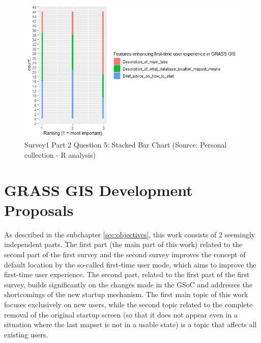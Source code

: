 \documentclass[a4paper,10pt,twoside]{article}
\begin{document}
\vspace{0.3cm}
\begin{figure}[hbt!] 
\begin{center}
\includegraphics[width=15cm]{../surveys/analyzed_data/survey1_part2_question5_histogram_r.png} 
\caption[Survey1 Part 2 Question 5: Stacked Bar Chart]{Survey1 Part 2 Question 5: Stacked Bar Chart (Source: Personal collection - R analysis)}
\label{fig:survey1_part2_question5_histogram_r}
\end{center}
\end{figure}

\newpage
\vspace*{-1cm}
\section{GRASS GIS Development Proposals}

\noindent As described in the subchapter \ref{sec:objectives}, this
work consists of 2 seemingly independent parts. The first part (the
main part of this work) related to the second part of the first survey
and the second survey improves the concept of default location by the
so-called first-time user mode, which aims to improve the first-time
user experience. The second part, related to the first part of the
first survey, builds significantly on the changes made in the GSoC and
addresses the shortcomings of the new startup mechanism. The first
main topic of this work focuses exclusively on new users, while the
second topic related to the complete removal of the original startup
screen (so that it does not appear even in a situation where the last
mapset is not in a usable state) is a topic that affects all existing
users.
\end{document}
